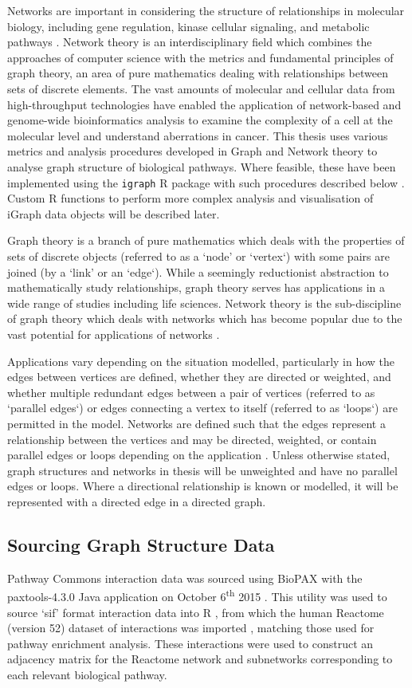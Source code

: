 Networks are important in considering the structure of relationships in molecular biology, including gene regulation, kinase cellular signaling, and metabolic pathways \citep{Barabasi2004}. Network theory is an interdisciplinary field which combines the approaches of computer science with the metrics and fundamental principles of graph theory, an area of pure mathematics dealing with relationships between sets of discrete elements. The vast amounts of molecular and cellular data from high-throughput technologies have enabled the application of network-based and genome-wide bioinformatics analysis to examine the complexity of a cell at the molecular level and understand aberrations in cancer. This thesis uses various metrics and analysis procedures developed in Graph and Network theory to analyse graph structure of biological pathways. Where feasible, these have been implemented using the \texttt{igraph} R package with such procedures described below \citep{igraph}. Custom R functions to perform more complex analysis and visualisation of iGraph data objects will be described later.

Graph theory is a branch of pure mathematics which deals with the properties of sets of discrete objects (referred to as a `node' or `vertex`) with some pairs are joined (by a `link' or an `edge`). While a seemingly reductionist abstraction to mathematically study relationships, graph theory serves has applications in a wide range of studies including life sciences. Network theory is the sub-discipline of graph theory which deals with networks which has become popular due to the vast potential for applications of networks \citep{vanSteen2010}. 

Applications vary depending on the situation modelled, particularly in how the edges between vertices are defined, whether they are directed or weighted, and whether multiple redundant edges between a pair of vertices (referred to as `parallel edges`) or edges connecting a vertex to itself (referred to as `loops`) are permitted in the model. Networks are defined such that the edges represent a relationship between the vertices and may be directed, weighted, or contain parallel edges or loops depending on the application \citep{vanSteen2010}. Unless otherwise stated, graph structures and networks in thesis will be unweighted and have no parallel edges or loops. Where a directional relationship is known or modelled, it will be represented with a directed edge in a directed graph.

\subsection{Sourcing Graph Structure Data} \label{methods:graph_data}
Pathway Commons interaction data was sourced using \gls{BioPAX} with the paxtools-4.3.0 Java application on October 6\textsuperscript{th} 2015 \citep{PathwayCommons, paxtools}. This utility was used to source `sif' format interaction data into R \citep{R_core}, from which the human Reactome (version 52) dataset of interactions was imported \citep{Reactome}, matching those used for pathway enrichment analysis. These interactions were used to construct an adjacency matrix for the Reactome network and subnetworks corresponding to each relevant biological pathway. 

